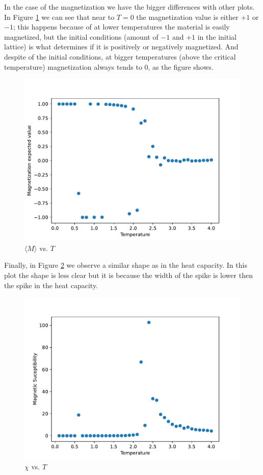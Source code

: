 \documentclass[
    10pt,
    journal,
    compsoc,
    english
]{IEEEtran}
\begin{document}
In the case of the magnetization we have the bigger differences with other plots. In Figure \ref{fig:magnet} we can see that near to $T=0$ the magnetization value is either $+1$ or $-1$; this happens because of at lower temperatures the material is easily magnetized, but the initial conditions (amount of $-1$ and $+1$ in the initial lattice) is what determines if it is positively or negatively magnetized. And despite of the initial conditions, at bigger temperatures (above the critical temperature) magnetization always tends to 0, as the figure shows. 
\begin{figure}[hbt]
    \centering
    \includegraphics[width=0.95\columnwidth]{img/magnet.pdf}
    \caption{$\langle M\rangle$ vs. $T$}
    \label{fig:magnet}
\end{figure}

Finally, in Figure \ref{fig:chi} we observe a similar shape as in the heat capacity. In this plot the shape is less clear but it is because the width of the spike is lower then the spike in the heat capacity.
\begin{figure}[hbt]
    \centering
    \includegraphics[width=0.95\columnwidth]{img/chi.pdf}
    \caption{$\chi$ vs. $T$}
    \label{fig:chi}
\end{figure}
\end{document}
